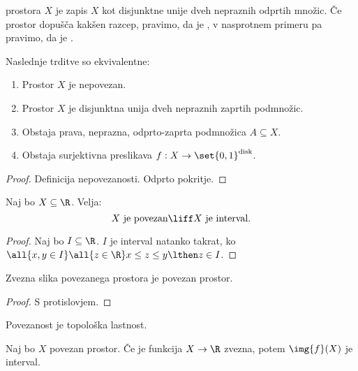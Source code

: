 \begin{definicija}
     prostora $X$ je zapis $X$ kot disjunktne unije dveh nepraznih odprtih množic. Če prostor dopušča kakšen razcep, pravimo, da je , v nasprotnem primeru pa pravimo, da je .
\end{definicija}

\begin{trditev}
    Naslednje trditve so ekvivalentne:
    \begin{enumerate}
        \item Prostor $X$ je nepovezan.
        \item Prostor $X$ je disjunktna unija dveh nepraznih zaprtih podmnožic.
        \item Obstaja prava, neprazna, odprto-zaprta podmnožica $A \subseteq X$.
        \item Obstaja surjektivna preslikava $f: X \to \set{0,1}^\text{disk}$. 
    \end{enumerate}
\end{trditev}

\begin{proof}
    Definicija nepovezanosti. Odprto pokritje.
\end{proof}

\begin{izrek}
    Naj bo $X \subseteq \R$. Velja: $$X \text{ je povezan} \liff X \text{ je interval}.$$
\end{izrek}

\begin{proof}
    Naj bo $I \subseteq \R$. $I$ je interval natanko takrat, ko $\all{x,y \in I} \all{z \in \R}x \leq z \leq y \lthen z \in I$.
\end{proof}

\begin{izrek}
    Zvezna slika povezanega prostora je povezan prostor.
\end{izrek}

\begin{proof}
    S protislovjem.
\end{proof}

\begin{opomba}
    Povezanost je topološka lastnost.
\end{opomba}

\begin{izrek}
    Naj bo $X$ povezan prostor. Če je funkcija $X \to \R$ zvezna, potem $\img{f}(X)$ je interval.
\end{izrek}

